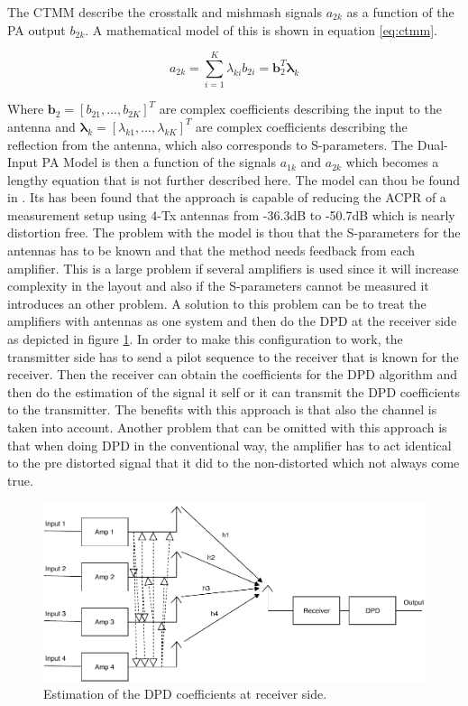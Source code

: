 The CTMM describe the crosstalk and mishmash signals $a_{2k}$ as a function of the PA output $b_{2k}$. A mathematical model of this is shown in equation \ref{eq:ctmm}.

\begin{equation} \label{eq:ctmm}
 a_{2k} = \sum_{i=1}^{K} \lambda_{ki} b_{2i} = \boldsymbol{b}_2^T \boldsymbol{\lambda}_k
\end{equation}

Where $\boldsymbol{b}_2 = [b_{21},...,b_{2K}]^T$ are complex coefficients describing the input to the antenna and $\boldsymbol{\lambda}_k = [\lambda_{k1},...,\lambda_{kK}]^T$ are complex coefficients describing the reflection from the antenna, which also corresponds to S-parameters. The Dual-Input PA Model is then a function of the signals $a_{1k}$ and $a_{2k}$ which becomes a lengthy equation that is not further described here. The model can thou be found in \citep{Hausmair2017}. Its has been found that the approach is capable of reducing the ACPR of a measurement setup using 4-Tx antennas from -36.3dB to -50.7dB which is nearly distortion free. The problem with the model is thou that the S-parameters for the antennas has to be known and that the method needs feedback from each amplifier. This is a large problem if several amplifiers is used since it will increase complexity in the layout and also if the S-parameters cannot be measured it introduces an other problem. A solution to this problem can be to treat the amplifiers with antennas as one system and then do the DPD at the receiver side as depicted in figure \ref{fig:dpd_pdpd}. In order to make this configuration to work, the transmitter side has to send a pilot sequence to the receiver that is known for the receiver. Then the receiver can obtain the coefficients for the DPD algorithm and then do the estimation of the signal it self or it can transmit the DPD coefficients to the transmitter. The benefits with this approach is that also the channel is taken into account. Another problem that can be omitted with this approach is that when doing DPD in the conventional way, the amplifier has to act identical to the pre distorted signal that it did to the non-distorted which not always come true.

 
\begin{figure}[H]
\centering 
\includegraphics[scale = 0.7]{figures/ch1/postDPD.pdf}
\caption{Estimation of the DPD coefficients at receiver side. }
\label{fig:dpd_pdpd}
\end{figure}

